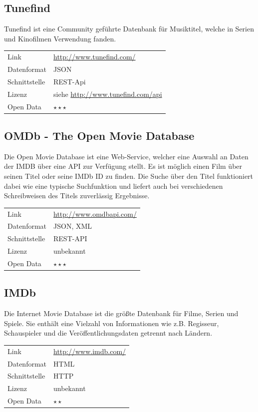 \documentclass[parskip]{scrartcl}
\begin{document}
\subsection{Tunefind}
\label{subsec:tunefind}

Tunefind ist eine Community geführte Datenbank für Musiktitel, welche in Serien und Kinofilmen Verwendung fanden.

\begin{tabular}{l|p{9cm}}
	Link & \url{http://www.tunefind.com/} \\
 	Datenformat & JSON \\
 	Schnittstelle & REST-Api \\
 	Lizenz & siehe \url{http://www.tunefind.com/api} \\
 	Open Data & $\star\star\star$ \\
\end{tabular}

\subsection{OMDb - The Open Movie Database}

Die Open Movie Database ist eine Web-Service, welcher eine Auswahl an Daten der IMDB über eine API zur Verfügung stellt. Es ist möglich einen Film über seinen  Titel oder seine IMDb ID zu finden. Die Suche über den Titel funktioniert dabei wie eine typische Suchfunktion und liefert auch bei verschiedenen Schreibweisen des Titels zuverlässig Ergebnisse.

\begin{tabular}{l|p{9cm}}
    Link & \url{http://www.omdbapi.com/} \\
    Datenformat & JSON, XML \\
    Schnittstelle & REST-API \\
    Lizenz & unbekannt \\
    Open Data & $\star\star\star$ \\
\end{tabular}

\subsection{IMDb}

Die Internet Movie Database ist die größte Datenbank für Filme, Serien und Spiele. Sie enthält eine Vielzahl von Informationen wie z.B. Regisseur, Schauspieler und die Veröffentlichungsdaten getrennt nach Ländern.

\begin{tabular}{l|p{9cm}}
	Link & \url{http://www.imdb.com/} \\
 	Datenformat & HTML \\
 	Schnittstelle & HTTP \\
 	Lizenz & unbekannt \\
 	Open Data & $\star\star$ \\
\end{tabular}
\end{document}
